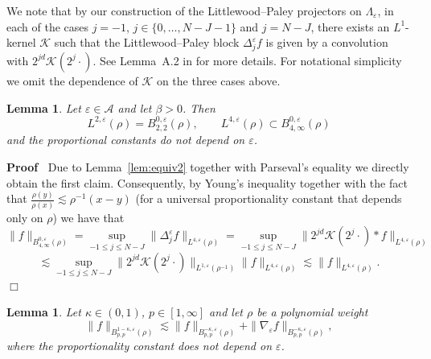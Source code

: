 \documentclass[a4paper,11pt]{article}
\newcommand{\cdummy}{\cdot}
\newenvironment{proof}{\noindent\textbf{Proof\ }}{\hspace*{\fill}$\Box$\medskip}
\newtheorem{lemma}[theorem]{Lemma}
\numberwithin{equation}{section}
\begin{document}
We note that by our construction of the Littlewood--Paley projectors on
$\Lambda_{\varepsilon}$, in each of the cases $j = - 1$, $j \in \{ 0, \ldots,
N - J - 1 \}$ and $j = N - J$, there exists an $L^1$-kernel $\mathcal{K}$ such
that the Littlewood--Paley block $\Delta^{\varepsilon}_j f$ is given by a
convolution with $2^{j d} \mathcal{K} (2^j \cdummy)$. See Lemma~A.2 in
{\cite{MP17}} for more details. For notational simplicity we omit the
dependence of $\mathcal{K}$ on the three cases above.

\begin{lemma}
  \label{lem:emb}Let $\varepsilon \in \mathcal{A}$ and let $\beta > 0$. Then
  \[ L^{2, \varepsilon} (\rho) = B^{0, \varepsilon}_{2, 2} (\rho), \qquad
     L^{4, \varepsilon} (\rho) \subset B^{0, \varepsilon}_{4, \infty} (\rho)
  \]
  and the proportional constants do not depend on $\varepsilon$.
\end{lemma}

\begin{proof}
  Due to Lemma~\ref{lem:equiv2} together with Parseval's equality we directly
  obtain the first claim. Consequently, by Young's inequality together with
  the fact that $\frac{\rho (y)}{\rho (x)} \lesssim \rho^{- 1} (x - y)$ (for a
  universal proportionality constant that depends only on $\rho$) we have that
  \[ \| f \|_{B^{0, \varepsilon}_{4, \infty} (\rho)} = \sup_{- 1 \leqslant
     j \leqslant N - J} \| \Delta_j^{\varepsilon} f \|_{L^{4, \varepsilon}
     (\rho)} = \sup_{- 1 \leqslant j \leqslant N - J} \| 2^{j d} \mathcal{K}
     (2^j \cdummy) \ast f \|_{L^{4, \varepsilon} (\rho)} \]
  \[ \lesssim \sup_{- 1 \leqslant j \leqslant N - J} \| 2^{j d} \mathcal{K}
     (2^j \cdummy) \|_{L^{1, \varepsilon} (\rho^{- 1})} \| f \|_{L^{4,
     \varepsilon} (\rho)} \lesssim \| f \|_{L^{4, \varepsilon} (\rho)} . \]
\end{proof}

\begin{lemma}
  \label{lem:grad}Let $\kappa \in (0, 1)$, $p \in [1, \infty]$ and let $\rho$
  be a polynomial weight
  \[ \| f \|_{B^{1 - \kappa, \varepsilon}_{p, p} (\rho)} \lesssim \| f
     \|_{B^{- \kappa, \varepsilon}_{p, p} (\rho)} + \| \nabla_{\varepsilon} f
     \|_{B^{- \kappa, \varepsilon}_{p, p} (\rho)}, \]
  where the proportionality constant does not depend on $\varepsilon$.
\end{lemma}
\end{document}
